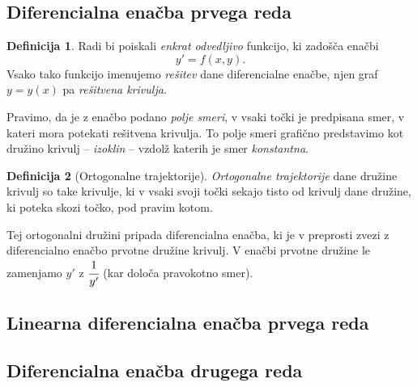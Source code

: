 \documentclass[11pt]{article}
\theoremstyle{definition}
\newtheorem{definicija}{Definicija}[section]
\theoremstyle{definition}
\theoremstyle{definition}
\theoremstyle{theorem}
\begin{document}
\subsection{Diferencialna enačba prvega reda}
\vspace{0.5cm}

\begin{definicija}

Radi bi poiskali \textit{enkrat odvedljivo} funkcijo, ki zadošča enačbi
$$y' = f(x, y).$$
Vsako tako funkcijo imenujemo \textit{rešitev} dane diferencialne enačbe, njen graf $y = y(x)$ pa \textit{rešitvena krivulja}.

Pravimo, da je z enačbo podano \textit{polje smeri}, v vsaki točki je predpisana smer, v kateri mora potekati rešitvena krivulja. To polje smeri grafično predstavimo kot družino krivulj \--- \textit{izoklin} \--- vzdolž katerih je smer \textit{konstantna}.

\end{definicija}
\vspace{0.5cm}

\begin{definicija}[Ortogonalne trajektorije]

\textit{Ortogonalne trajektorije} dane družine krivulj so take krivulje, ki v vsaki svoji točki sekajo tisto od krivulj dane družine, ki poteka skozi točko, pod pravim kotom.

Tej ortogonalni družini pripada diferencialna enačba, ki je v preprosti zvezi z diferencialno enačbo prvotne družine krivulj. V enačbi prvotne družine le zamenjamo $y'$ z $\cfrac{1}{y'}$ (kar določa pravokotno smer).

\end{definicija}
\vspace{0.5cm}


\subsection{Linearna diferencialna enačba prvega reda}
\vspace{0.5cm}


\subsection{Diferencialna enačba drugega reda}
\vspace{0.5cm}


\pagebreak

\end{document}
